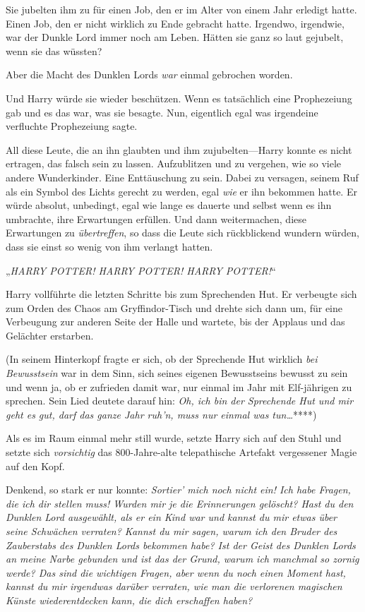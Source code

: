 {Sie jubelten ihm zu für einen Job, den er im Alter von einem Jahr erledigt hatte. Einen Job, den er nicht wirklich zu Ende gebracht hatte. Irgendwo, irgendwie, war der Dunkle Lord immer noch am Leben. Hätten sie ganz so laut gejubelt, wenn sie das wüssten?

Aber die Macht des Dunklen Lords \emph{war} einmal gebrochen worden.

Und Harry würde sie wieder beschützen. Wenn es tatsächlich eine Prophezeiung gab und es das war, was sie besagte. Nun, eigentlich egal was irgendeine verfluchte Prophezeiung sagte.

All diese Leute, die an ihn glaubten und ihm zujubelten—Harry konnte es nicht ertragen, das falsch sein zu lassen. Aufzublitzen und zu vergehen, wie so viele andere Wunderkinder. Eine Enttäuschung zu sein. Dabei zu versagen, seinem Ruf als ein Symbol des Lichts gerecht zu werden, egal \emph{wie} er ihn bekommen hatte. Er würde absolut, unbedingt, egal wie lange es dauerte und selbst wenn es ihn umbrachte, ihre Erwartungen erfüllen. Und dann weitermachen, diese Erwartungen zu \emph{übertreffen}, so dass die Leute sich rückblickend wundern würden, dass sie einst so wenig von ihm verlangt hatten.

„\emph{HARRY POTTER! HARRY POTTER! HARRY POTTER!}“

Harry vollführte die letzten Schritte bis zum Sprechenden Hut. Er verbeugte sich zum Orden des Chaos am Gryffindor-Tisch und drehte sich dann um, für eine Verbeugung zur anderen Seite der Halle und wartete, bis der Applaus und das Gelächter erstarben.

(In seinem Hinterkopf fragte er sich, ob der Sprechende Hut wirklich \emph{bei Bewusstsein} war in dem Sinn, sich seines eigenen Bewusstseins bewusst zu sein und wenn ja, ob er zufrieden damit war, nur einmal im Jahr mit Elf-jährigen zu sprechen. Sein Lied deutete darauf hin: \emph{Oh, ich bin der Sprechende Hut und mir geht es gut, darf das ganze Jahr ruh'n, muss nur einmal was tun…}****)

Als es im Raum einmal mehr still wurde, setzte Harry sich auf den Stuhl und setzte sich \emph{vorsichtig} das 800-Jahre-alte telepathische Artefakt vergessener Magie auf den Kopf.

Denkend, so stark er nur konnte: \emph{Sortier' mich noch nicht ein! Ich habe Fragen, die ich dir stellen muss! Wurden mir je die Erinnerungen gelöscht? Hast du den Dunklen Lord ausgewählt, als er ein Kind war und kannst du mir etwas über seine Schwächen verraten? Kannst du mir sagen, warum ich den Bruder des Zauberstabs des Dunklen Lords bekommen habe? Ist der Geist des Dunklen Lords an meine Narbe gebunden und ist das der Grund, warum ich manchmal so zornig werde? Das sind die wichtigen Fragen, aber wenn du noch einen Moment hast, kannst du mir irgendwas darüber verraten, wie man die verlorenen magischen Künste wiederentdecken kann, die dich erschaffen haben?}

}
